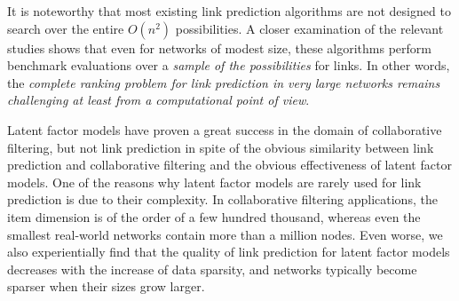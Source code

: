 It is noteworthy that most existing link prediction algorithms are not designed to search over the entire
$O(n^2)$ possibilities. A closer examination of the relevant
studies shows that even for networks of modest size, these
algorithms perform benchmark evaluations over a {\em
sample of the possibilities} for links.  In other
words, the {\em complete ranking problem for link prediction in
very large networks remains challenging at least from a
computational point of view}.


Latent factor models have proven a great success in the domain of
collaborative filtering, but not link prediction in spite of the obvious
similarity between link prediction and collaborative filtering and
the obvious effectiveness of latent factor models. One of the reasons why latent factor models are rarely used for
link prediction is due to their complexity. In
collaborative filtering applications, the item dimension is of the
order of a few hundred thousand, whereas even the smallest  real-world networks contain more than a million nodes.
Even worse, we also experientially find that the quality of link prediction for latent factor models decreases with the increase of data sparsity,
and networks typically become sparser when their sizes grow larger.







